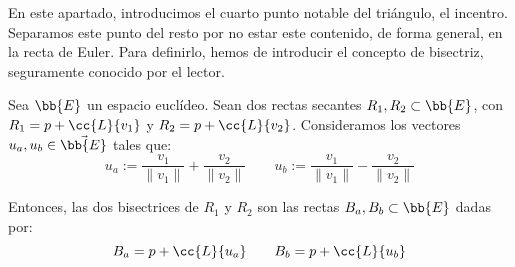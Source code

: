 En este apartado, introducimos el cuarto punto notable del triángulo, el incentro. Separamos este punto del resto por no estar este contenido, de forma general, en la recta de Euler.
Para definirlo, hemos de introducir el concepto de bisectriz, seguramente conocido por el lector.
\begin{definicion}
    Sea $\bb{E}$ un espacio euclídeo. Sean dos rectas secantes $R_1,R_2\subset \bb{E}$, con $R_1=p + \cc{L}\{v_1\}$ y $R_2=p + \cc{L}\{v_2\}$.
    Consideramos los vectores $u_a,u_b\in \vec{\bb{E}}$ tales que:
    \begin{equation*}
        u_a := \frac{v_1}{\|v_1\|} + \frac{v_2}{\|v_2\|} \qquad u_b := \frac{v_1}{\|v_1\|} - \frac{v_2}{\|v_2\|}
    \end{equation*}

    Entonces, las dos bisectrices de $R_1$ y $R_2$ son las rectas $B_a,B_b\subset \bb{E}$ dadas por:
    \begin{equation*}
        B_a = p + \cc{L}\{u_a\} \qquad B_b = p + \cc{L}\{u_b\}
    \end{equation*}

    \begin{figure}[H]
        \centering
\end{figure}
\end{definicion}
